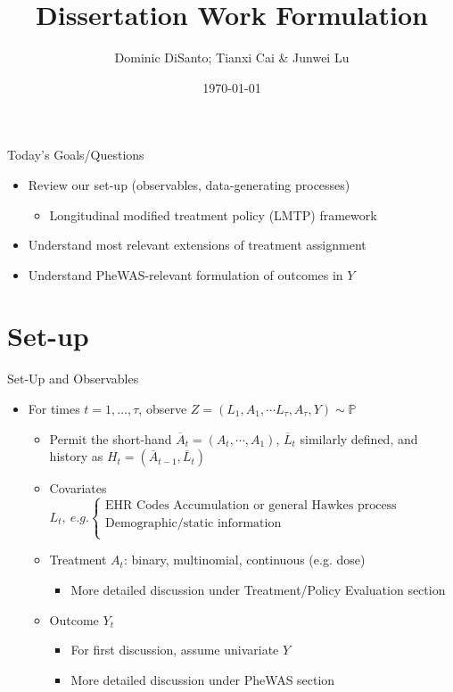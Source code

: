 \documentclass{beamer}
\title{Dissertation Work Formulation}
\author{Dominic DiSanto; Tianxi Cai \& Junwei Lu}
\institute[]{Department of Biostatistics, Harvard University}
\date{\today}
\newcommand{\Abar}{\overline{A}}
\newcommand{\Lbar}{\overline{L}}
\newcommand{\subitem}[1]{\begin{itemize} \item #1 \end{itemize}}
\newcommand{\PP}{\mathbb{P}}
\begin{document}
\frame[plain]{\titlepage}

\begin{frame}{Today's Goals/Questions}
    \begin{itemize}\setlength\itemsep{0.75em}
        \item Review our set-up (observables, data-generating processes)
            \subitem{Longitudinal modified treatment policy (LMTP) framework}
        \item Understand most relevant extensions of treatment assignment
        \item Understand PheWAS-relevant formulation of outcomes in $Y$
    \end{itemize}
\end{frame}


\section{Set-up}


\begin{frame}{Set-Up and Observables}
    \begin{itemize}\setlength\itemsep{1em}
        \item For times $t=1, \dots, \tau$, observe $Z = (L_1, A_1, \cdots L_\tau, A_\tau, Y) \sim \PP$ \vspace{0.5em}
            \subitem{Permit the short-hand $\Abar_t = (A_t, \cdots, A_1)$, $\Lbar_t$ similarly defined, and history as $H_t = (\Abar_{t-1}, \Lbar_t)$} \vspace{0.5em}
        
            \subitem{Covariates $L_t, \ e.g. 
            \begin{cases} 
                \text{EHR Codes Accumulation or general Hawkes process} \\ 
                \text{Demographic/static information} \\
            \end{cases}
            $
            } \vspace{0.5em}

            \subitem{Treatment $A_t$: binary, multinomial, continuous (e.g. dose)
                \subitem{More detailed discussion under Treatment/Policy Evaluation section}
            } \vspace{0.5em}

            \subitem{Outcome $Y_t$
                \subitem{For first discussion, assume univariate $Y$} 
                \subitem{More detailed discussion under PheWAS section}
            } 
        \end{itemize}

\end{frame}
\end{document}
